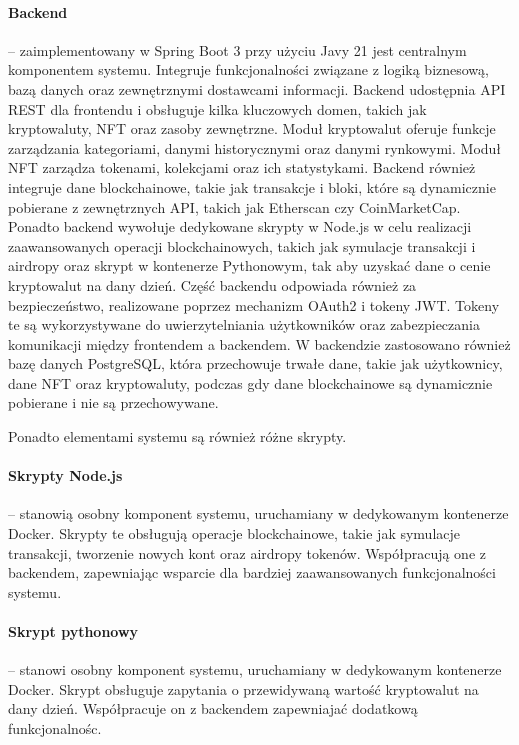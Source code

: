 \paragraph{Backend} -- zaimplementowany w Spring Boot 3 przy użyciu Javy 21 jest centralnym komponentem systemu. Integruje funkcjonalności związane z logiką biznesową, bazą danych oraz zewnętrznymi dostawcami informacji. Backend udostępnia API REST dla frontendu i obsługuje kilka kluczowych domen, takich jak kryptowaluty, NFT oraz zasoby zewnętrzne. Moduł kryptowalut oferuje funkcje zarządzania kategoriami, danymi historycznymi oraz danymi rynkowymi. Moduł NFT zarządza tokenami, kolekcjami oraz ich statystykami. Backend również integruje dane blockchainowe, takie jak transakcje i bloki, które są dynamicznie pobierane z zewnętrznych API, takich jak Etherscan czy CoinMarketCap. Ponadto backend wywołuje dedykowane skrypty w Node.js w celu realizacji zaawansowanych operacji blockchainowych, takich jak symulacje transakcji i airdropy oraz skrypt w kontenerze Pythonowym, tak aby uzyskać dane o cenie kryptowalut na dany dzień.
\newline
Część backendu odpowiada również za bezpieczeństwo, realizowane poprzez mechanizm OAuth2 i tokeny JWT. Tokeny te są wykorzystywane do uwierzytelniania użytkowników oraz zabezpieczania komunikacji między frontendem a backendem. W backendzie zastosowano również bazę danych PostgreSQL, która przechowuje trwałe dane, takie jak użytkownicy, dane NFT oraz kryptowaluty, podczas gdy dane blockchainowe są dynamicznie pobierane i nie są przechowywane.

Ponadto elementami systemu są również różne skrypty. 
\paragraph{Skrypty Node.js} -- stanowią osobny komponent systemu, uruchamiany w dedykowanym kontenerze Docker. Skrypty te obsługują operacje blockchainowe, takie jak symulacje transakcji, tworzenie nowych kont oraz airdropy tokenów. Współpracują one z backendem, zapewniając wsparcie dla bardziej zaawansowanych funkcjonalności systemu.

\paragraph{Skrypt pythonowy} -- stanowi osobny komponent systemu, uruchamiany w dedykowanym kontenerze Docker. Skrypt obsługuje zapytania o przewidywaną wartość kryptowalut na dany dzień. Współpracuje on z backendem zapewniajać dodatkową funkcjonalnośc.

